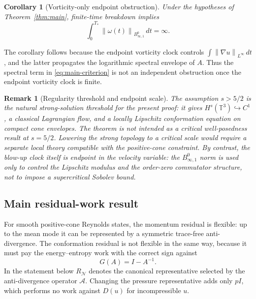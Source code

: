 \documentclass[10pt,a4paper]{amsart}
\numberwithin{equation}{section}
\newtheorem{corollary}[theorem]{Corollary}
\newtheorem{remark}[theorem]{Remark}
\newcommand{\T}{\mathbb T}
\newcommand{\Id}{I}
\newcommand{\Besov}{B^0_{\infty,1}}
\newcommand{\calN}{\mathcal N}
\newcommand{\calA}{\mathcal A}
\newcommand{\norm}[1]{\left\lVert #1\right\rVert}
\begin{document}
\begin{corollary}[Vorticity-only endpoint obstruction]
\label{cor:vorticity-only}
Under the hypotheses of Theorem~\ref{thm:main}, finite-time breakdown implies
\[
  \int_0^{T_*}\norm{\omega(t)}_{\Besov}\,dt=\infty .
\]
\end{corollary}

The corollary follows because the endpoint vorticity clock controls
\(\int\norm{\nabla u}_{L^\infty}\,dt\), and the latter propagates the
logarithmic spectral envelope of \(A\).  Thus the spectral term in
\eqref{eq:main-criterion} is not an independent obstruction once the endpoint
vorticity clock is finite.

\begin{remark}[Regularity threshold and endpoint scale]
The assumption \(s>5/2\) is the natural strong-solution threshold for the
present proof: it gives \(H^s(\T^3)\hookrightarrow C^1\), a classical
Lagrangian flow, and a locally Lipschitz conformation equation on compact cone
envelopes.  The theorem is not intended as a critical well-posedness result at
\(s=5/2\).  Lowering the strong topology to a critical scale would require a
separate local theory compatible with the positive-cone constraint.  By
contrast, the blow-up clock itself is endpoint in the velocity variable: the
\(B^0_{\infty,1}\) norm is used only to control the Lipschitz modulus and the
order-zero commutator structure, not to impose a supercritical Sobolev bound.
\end{remark}

\subsection*{Main residual-work result}

For smooth positive-cone Reynolds states, the momentum residual is flexible:
up to the mean mode it can be represented by a symmetric trace-free
anti-divergence.  The conformation residual is not flexible in the same way,
because it must pay the energy--entropy work with the correct sign against
\[
  G(A)=\Id-A^{-1}.
\]
In the statement below \(R_{\calN}\) denotes the canonical representative
selected by the anti-divergence operator \(\calA\).  Changing the pressure
representative adds only \(p\Id\), which performs no work against \(D(u)\) for
incompressible \(u\).
\end{document}
